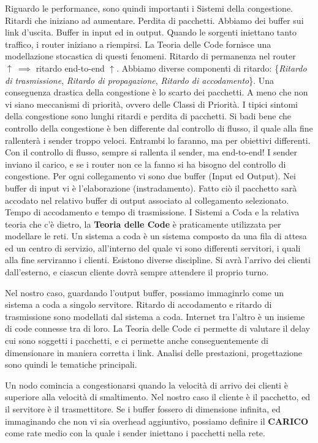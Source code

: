 Riguardo le performance, sono quindi importanti i Sistemi della congestione. Ritardi che iniziano ad aumentare. Perdita di pacchetti. Abbiamo dei buffer sui link d'uscita. Buffer in input ed in output. Quando le sorgenti iniettano tanto traffico, i router iniziano a riempirsi. La Teoria delle Code fornisce una modellazione stocastica di questi fenomeni. Ritardo di permanenza nel router $\uparrow\ \implies$ ritardo end-to-end $\uparrow$. Abbiamo diverse componenti di ritardo: \{\textit{Ritardo di trasmissione}, \textit{Ritardo di propagazione}, \textit{Ritardo di accodamento}\}. Una conseguenza drastica della congestione è lo scarto dei pacchetti. A meno che non vi siano meccanismi di priorità, ovvero delle Classi di Priorità. I tipici sintomi della congestione sono lunghi ritardi e perdita di pacchetti. Si badi bene che controllo della congestione è ben differente dal controllo di flusso, il quale alla fine rallenterà i sender troppo veloci. Entrambi lo faranno, ma per obiettivi differenti. Con il controllo di flusso, sempre si rallenta il sender, ma end-to-end! I sender inviano il carico, e se i router non ce la fanno si ha bisogno del controllo di congestione. Per ogni collegamento vi sono due buffer (Input ed Output). Nei buffer di input vi è l'elaborazione (instradamento). Fatto ciò il pacchetto sarà accodato nel relativo buffer di output associato al collegamento selezionato. Tempo di accodamento e tempo di trasmissione. I Sistemi a Coda e la relativa teoria che c'è dietro, la \textbf{Teoria delle Code} è praticamente utilizzata per modellare le reti. Un sistema a coda è un sistema composto da una fila di attesa ed un centro di servizio, all'interno del quale vi sono differenti servitori, i quali alla fine serviranno i clienti. Esistono diverse discipline. Si avrà l'arrivo dei clienti dall'esterno, e ciascun cliente dovrà sempre attendere il proprio turno.

Nel nostro caso, guardando l'output buffer, possiamo immaginrlo come un sistema a coda a singolo servitore. Ritardo di accodamento e ritardo di trasmissione sono modellati dal sistema a coda. Internet tra l'altro è un insieme di code connesse tra di loro. La Teoria delle Code ci permette di valutare il delay cui sono soggetti i pacchetti, e ci permette anche conseguentemente di dimensionare in maniera corretta i link. Analisi delle prestazioni, progettazione sono quindi le tematiche principali.

Un nodo comincia a congestionarsi quando la velocità di arrivo dei clienti è superiore alla velocità di smaltimento. Nel nostro caso il cliente è il pacchetto, ed il servitore è il trasmettitore. Se i buffer fossero di dimensione infinita, ed immaginando che non vi sia overhead aggiuntivo, possiamo definire il \textbf{CARICO} come rate medio con la quale i sender iniettano i pacchetti nella rete.

